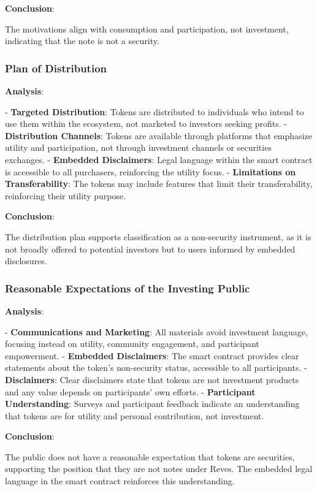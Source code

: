 \documentclass[a4paper,12pt]{article}
\begin{document}
\textbf{Conclusion}:

The motivations align with consumption and participation, not investment, indicating that the note is not a security.

\subsubsection{Plan of Distribution}
\textbf{Analysis}:

- \textbf{Targeted Distribution}: Tokens are distributed to individuals who intend to use them within the ecosystem, not marketed to investors seeking profits.
- \textbf{Distribution Channels}: Tokens are available through platforms that emphasize utility and participation, not through investment channels or securities exchanges.
- \textbf{Embedded Disclaimers}: Legal language within the smart contract is accessible to all purchasers, reinforcing the utility focus.
- \textbf{Limitations on Transferability}: The tokens may include features that limit their transferability, reinforcing their utility purpose.

\textbf{Conclusion}:

The distribution plan supports classification as a non-security instrument, as it is not broadly offered to potential investors but to users informed by embedded disclosures.

\subsubsection{Reasonable Expectations of the Investing Public}
\textbf{Analysis}:

- \textbf{Communications and Marketing}: All materials avoid investment language, focusing instead on utility, community engagement, and participant empowerment.
- \textbf{Embedded Disclaimers}: The smart contract provides clear statements about the token's non-security status, accessible to all participants.
- \textbf{Disclaimers}: Clear disclaimers state that tokens are not investment products and any value depends on participants' own efforts.
- \textbf{Participant Understanding}: Surveys and participant feedback indicate an understanding that tokens are for utility and personal contribution, not investment.

\textbf{Conclusion}:

The public does not have a reasonable expectation that tokens are securities, supporting the position that they are not notes under Reves. The embedded legal language in the smart contract reinforces this understanding.
\end{document}
